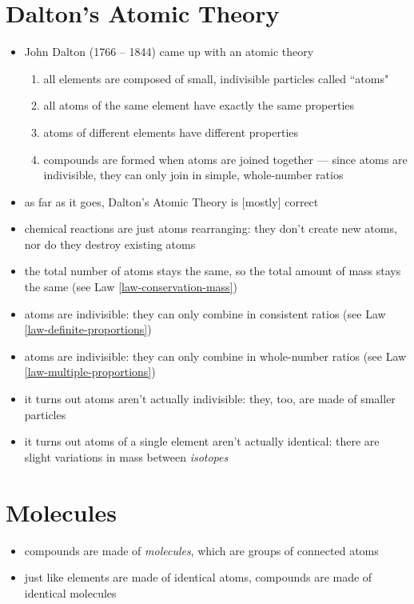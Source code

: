 \documentclass[11pt, oneside]{article}   	%
\begin{document}
\section{Dalton's Atomic Theory}
\begin{itemize}
\item John Dalton (1766 -- 1844) came up with an atomic theory\cite[p. 83--85]{wile-chem-2}
\begin{enumerate}
\item all elements are composed of small, indivisible particles called ``atoms"
\item all atoms of the same element have exactly the same properties
\item atoms of different elements have different properties
\item compounds are formed when atoms are joined together --- since atoms are indivisible, they can only join in simple, whole-number ratios
\end{enumerate}
\item as far as it goes, Dalton's Atomic Theory is [mostly] correct
\item chemical reactions are just atoms rearranging: they don't create new atoms, nor do they destroy existing atoms
\item the total number of atoms stays the same, so the total amount of mass stays the same (see Law \ref{law-conservation-mass})
\item atoms are indivisible: they can only combine in consistent ratios (see Law \ref{law-definite-proportions})
\item atoms are indivisible: they can only combine in whole-number ratios (see Law \ref{law-multiple-proportions})
\item it turns out atoms aren't actually indivisible: they, too, are made of smaller particles\cite[p. 85]{wile-chem-2}
\item it turns out atoms of a single element aren't actually identical: there are slight variations in mass between \emph{isotopes}\cite[p. 85]{wile-chem-2}
\end{itemize}


\section{Molecules}
\begin{itemize}
\item compounds are made of \emph{molecules}, which are groups of connected atoms
\item just like elements are made of identical atoms, compounds are made of identical molecules
\end{itemize}
\end{document}
